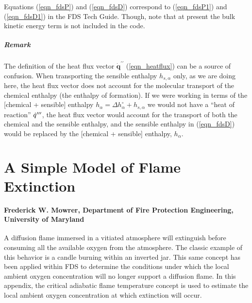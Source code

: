 Equations (\ref{eqn_fdsP}) and (\ref{eqn_fdsD}) correspond to (\ref{eqn_fdsP1}) and (\ref{eqn_fdsD1}) in the FDS Tech Guide.  Though, note that at present the bulk kinetic energy term is not included in the code.

\paragraph{Remark} The definition of the heat flux vector $\dot{\mathbf{q}}^{\prime\prime}$ (\ref{eqn_heatflux}) can be a source of confusion. When transporting the sensible enthalpy $h_{s,\alpha}$ only, as we are doing here, the heat flux vector does not account for the molecular transport of the chemical enthalpy (the enthalpy of formation).  If we were working in terms of the [chemical + sensible] enthalpy $h_\alpha = \Delta h_\alpha^\circ + h_{s,\alpha}$ we would not have a ``heat of reaction'' $\dot{q}^{{\prime\prime\prime}}$, the heat flux vector would account for the transport of both the chemical and the sensible enthalpy, and the sensible enthalpy in (\ref{eqn_fdsD}) would be replaced by the [chemical + sensible] enthalpy, $h_{\alpha}$.




\chapter{A Simple Model of Flame Extinction}

\subsubsection{Frederick W. Mowrer, Department of Fire Protection Engineering, University of Maryland}

\label{mowrer_model}


A diffusion flame immersed in a vitiated atmosphere will extinguish before consuming all the
available oxygen from the atmosphere.  The classic example of this behavior is a candle burning
within an inverted jar.  This same concept has been applied within FDS
to determine the conditions under which the local ambient oxygen concentration will no longer
support a diffusion flame.  In this appendix, the critical adiabatic flame temperature
concept is used to estimate the local ambient oxygen concentration at which extinction will
occur.

